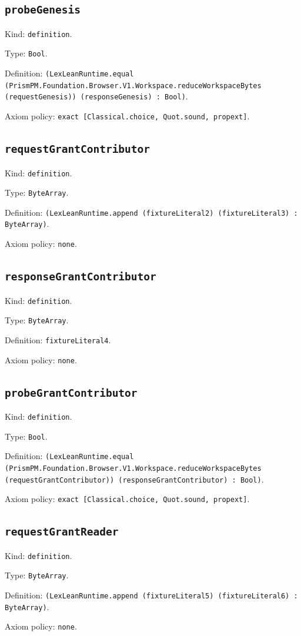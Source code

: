 \documentclass[11pt]{article}
\begin{document}
\subsection*{\texttt{probeGenesis}}
\noindent Kind: \texttt{definition}.\par
\noindent Type: \texttt{Bool}.\par
\noindent Definition: \texttt{(LexLeanRuntime.equal (PrismPM.Foundation.Browser.V1.Workspace.reduceWorkspaceBytes (requestGenesis)) (responseGenesis) : Bool)}.\par
\noindent Axiom policy: \texttt{exact [Classical.choice, Quot.sound, propext]}.\par
\subsection*{\texttt{requestGrantContributor}}
\noindent Kind: \texttt{definition}.\par
\noindent Type: \texttt{ByteArray}.\par
\noindent Definition: \texttt{(LexLeanRuntime.append (fixtureLiteral2) (fixtureLiteral3) : ByteArray)}.\par
\noindent Axiom policy: \texttt{none}.\par
\subsection*{\texttt{responseGrantContributor}}
\noindent Kind: \texttt{definition}.\par
\noindent Type: \texttt{ByteArray}.\par
\noindent Definition: \texttt{fixtureLiteral4}.\par
\noindent Axiom policy: \texttt{none}.\par
\subsection*{\texttt{probeGrantContributor}}
\noindent Kind: \texttt{definition}.\par
\noindent Type: \texttt{Bool}.\par
\noindent Definition: \texttt{(LexLeanRuntime.equal (PrismPM.Foundation.Browser.V1.Workspace.reduceWorkspaceBytes (requestGrantContributor)) (responseGrantContributor) : Bool)}.\par
\noindent Axiom policy: \texttt{exact [Classical.choice, Quot.sound, propext]}.\par
\subsection*{\texttt{requestGrantReader}}
\noindent Kind: \texttt{definition}.\par
\noindent Type: \texttt{ByteArray}.\par
\noindent Definition: \texttt{(LexLeanRuntime.append (fixtureLiteral5) (fixtureLiteral6) : ByteArray)}.\par
\noindent Axiom policy: \texttt{none}.\par
\end{document}
